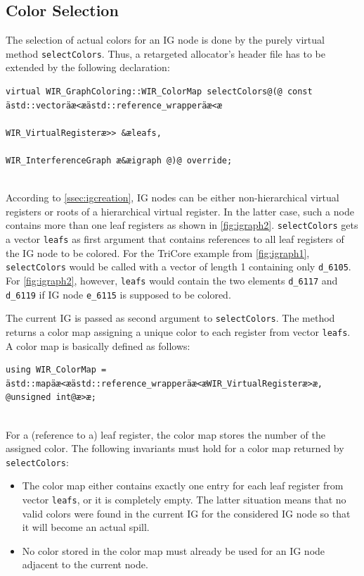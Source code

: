 \subsection{Color Selection}
\label{ssec:colorselect}

The selection of actual colors for an \gls{IG} node is done by the purely virtual method \texttt{selectColors}.
Thus, a retargeted allocator's header file has to be extended by the following declaration: \\
\begin{lstlisting}[style=code,float=!ht,aboveskip=-0.8 \baselineskip,belowskip=-0.8 \baselineskip]
virtual WIR_GraphColoring::WIR_ColorMap selectColors@(@ const ästd::vectoräæ<æästd::reference_wrapperäæ<æ
                                                        WIR_VirtualRegisteræ>> &æleafs,
                                                      WIR_InterferenceGraph æ&æigraph @)@ override;
\end{lstlisting}
\\
According to \cref{ssec:igcreation}, \gls{IG} nodes can be either non-hierarchical virtual registers or roots of a hierarchical virtual register.
In the latter case, such a node contains more than one leaf registers as shown in \cref{fig:igraph2}.
\texttt{selectColors} gets a vector \texttt{leafs} as first argument that contains references to all leaf registers of the \gls{IG} node to be colored.
For the TriCore example from \cref{fig:igraph1}, \texttt{selectColors} would be called with a vector of length 1 containing only \texttt{d\_6105}.
For \cref{fig:igraph2}, however, \texttt{leafs} would contain the two elements \texttt{d\_6117} and \texttt{d\_6119} if \gls{IG} node \texttt{e\_6115} is supposed to be colored.

The current \gls{IG} is passed as second argument to \texttt{selectColors}.
The method returns a color map assigning a unique color to each register from vector \texttt{leafs}.
A color map is basically defined as follows: \\
\begin{lstlisting}[style=code,float=!ht,aboveskip=-0.8 \baselineskip,belowskip=-0.8 \baselineskip]
using WIR_ColorMap = ästd::mapäæ<æästd::reference_wrapperäæ<æWIR_VirtualRegisteræ>æ, @unsigned int@æ>æ;
\end{lstlisting}
\\
For a (reference to a) leaf register, the color map stores the number of the assigned color.
The following invariants must hold for a color map returned by \texttt{selectColors}:
\begin{itemize}
  \item The color map either contains exactly one entry for each leaf register from vector \texttt{leafs}, or it is completely empty.
  The latter situation means that no valid colors were found in the current \gls{IG} for the considered \gls{IG} node so that it will become an actual spill.
  \item No color stored in the color map must already be used for an \gls{IG} node adjacent to the current node.
\end{itemize}


